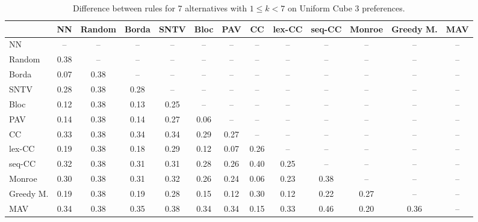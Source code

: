 
\begin{table*}[htbp]
\centering
\begin{tabular}{lcccccccccccc}
\toprule
 & NN & Random & Borda & SNTV & Bloc & PAV & CC & lex-CC & seq-CC & Monroe & Greedy M. & MAV \\
\midrule
NN & -- & -- & -- & -- & -- & -- & -- & -- & -- & -- & -- & -- \\
Random & \cellcolor{blue!38} 0.38 & -- & -- & -- & -- & -- & -- & -- & -- & -- & -- & -- \\
Borda & \cellcolor{blue!7} 0.07 & \cellcolor{blue!38} 0.38 & -- & -- & -- & -- & -- & -- & -- & -- & -- & -- \\
SNTV & \cellcolor{blue!28} 0.28 & \cellcolor{blue!38} 0.38 & \cellcolor{blue!28} 0.28 & -- & -- & -- & -- & -- & -- & -- & -- & -- \\
Bloc & \cellcolor{blue!12} 0.12 & \cellcolor{blue!38} 0.38 & \cellcolor{blue!13} 0.13 & \cellcolor{blue!25} 0.25 & -- & -- & -- & -- & -- & -- & -- & -- \\
PAV & \cellcolor{blue!14} 0.14 & \cellcolor{blue!38} 0.38 & \cellcolor{blue!14} 0.14 & \cellcolor{blue!27} 0.27 & \cellcolor{blue!6} 0.06 & -- & -- & -- & -- & -- & -- & -- \\
CC & \cellcolor{blue!33} 0.33 & \cellcolor{blue!38} 0.38 & \cellcolor{blue!34} 0.34 & \cellcolor{blue!34} 0.34 & \cellcolor{blue!28} 0.29 & \cellcolor{blue!27} 0.27 & -- & -- & -- & -- & -- & -- \\
lex-CC & \cellcolor{blue!19} 0.19 & \cellcolor{blue!38} 0.38 & \cellcolor{blue!18} 0.18 & \cellcolor{blue!28} 0.29 & \cellcolor{blue!12} 0.12 & \cellcolor{blue!7} 0.07 & \cellcolor{blue!26} 0.26 & -- & -- & -- & -- & -- \\
seq-CC & \cellcolor{blue!32} 0.32 & \cellcolor{blue!38} 0.38 & \cellcolor{blue!31} 0.31 & \cellcolor{blue!31} 0.31 & \cellcolor{blue!28} 0.28 & \cellcolor{blue!26} 0.26 & \cellcolor{blue!40} 0.40 & \cellcolor{blue!25} 0.25 & -- & -- & -- & -- \\
Monroe & \cellcolor{blue!30} 0.30 & \cellcolor{blue!38} 0.38 & \cellcolor{blue!31} 0.31 & \cellcolor{blue!32} 0.32 & \cellcolor{blue!26} 0.26 & \cellcolor{blue!24} 0.24 & \cellcolor{blue!6} 0.06 & \cellcolor{blue!23} 0.23 & \cellcolor{blue!38} 0.38 & -- & -- & -- \\
Greedy M. & \cellcolor{blue!19} 0.19 & \cellcolor{blue!38} 0.38 & \cellcolor{blue!19} 0.19 & \cellcolor{blue!28} 0.28 & \cellcolor{blue!15} 0.15 & \cellcolor{blue!12} 0.12 & \cellcolor{blue!30} 0.30 & \cellcolor{blue!12} 0.12 & \cellcolor{blue!22} 0.22 & \cellcolor{blue!27} 0.27 & -- & -- \\
MAV & \cellcolor{blue!34} 0.34 & \cellcolor{blue!38} 0.38 & \cellcolor{blue!35} 0.35 & \cellcolor{blue!38} 0.38 & \cellcolor{blue!34} 0.34 & \cellcolor{blue!34} 0.34 & \cellcolor{blue!15} 0.15 & \cellcolor{blue!33} 0.33 & \cellcolor{blue!46} 0.46 & \cellcolor{blue!20} 0.20 & \cellcolor{blue!36} 0.36 & -- \\
\bottomrule
\end{tabular}

\caption{Difference between rules for 7 alternatives with $1 \leq k < 7$ on Uniform Cube 3 preferences.}
\label{tab:rule_distance_heatmap-m=[7]-pref_dist=euclidean__args__dimensions=3_-_space=uniform_cube}
\end{table*}
    